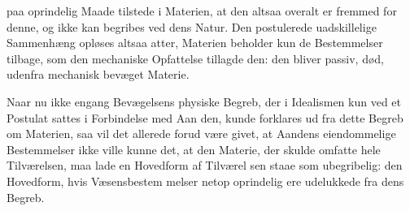 \documentclass[12pt,a4paper]{book}
\begin{document}
paa oprindelig Maade tilstede i Materien, at den altsaa overalt
er fremmed for denne, og ikke kan begribes ved dens Natur.
Den postulerede uadskillelige Sammenhæng opløses altsaa
atter, Materien beholder kun de Bestemmelser tilbage, som
den mechaniske Opfattelse tillagde den: den bliver passiv, død,
udenfra mechanisk bevæget Materie.

Naar nu ikke engang Bevægelsens physiske Begreb, der i
Idealismen kun ved et Postulat sattes i Forbindelse med Aan\-%
den, kunde forklares ud fra dette Begreb om Materien, saa
vil det allerede forud være givet, at Aandens eiendommelige
Bestemmelser ikke ville kunne det, at den Materie, der skulde
omfatte hele Tilværelsen, maa lade en Hovedform af Tilværel\-%
sen staae som ubegribelig: den Hovedform, hvis Væsensbestem\-%
melser netop oprindelig ere udelukkede fra dens Begreb.
\end{document}
